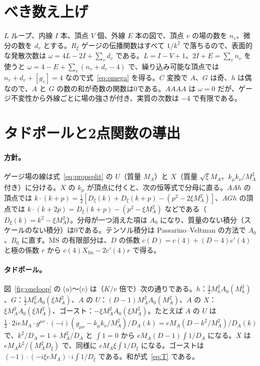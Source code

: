 \documentclass[a4paper,10pt]{ltjsarticle}
\newcommand{\MSbar}{\overline{\mathrm{MS}}}
\begin{document}
\section{べき数え上げ}\label{app:counting}

$L$ ループ、内線 $I$ 本、頂点 $V$ 個、外線 $E$ 本の図で、頂点 $v$ の場の数を $n_v$、微分の数を $d_v$ とする。$R_\xi$ ゲージの伝播関数はすべて $1/k^2$ で落ちるので、表面的な発散次数は $\omega=4L-2I+\sum_vd_v$ である。$L=I-V+1$、$2I+E=\sum_vn_v$ を使うと $\omega=4-E+\sum_v(n_v+d_v-4)$ で、繰り込み可能な頂点では $n_v+d_v+[g_v]=4$ なので式~\eqref{eq:omega} を得る。$C$ 変換で $A$、$G$ は奇、$h$ は偶なので、$A$ と $G$ の数の和が奇数の関数は0である。$AAAA$ は $\omega=0$ だが、ゲージ不変性から外線ごとに場の強さが付き、実質の次数は $-4$ で有限である。

\section{タドポールと2点関数の導出}\label{app:se}

\paragraph{方針。}ゲージ場の線は式~\eqref{eq:propsplit} の $U$（質量 $M_A$）と $X$（質量 $\sqrt\xi M_A$、$k_\mu k_\nu/M_A^2$ 付き）に分ける。$X$ の $k_\mu$ が頂点に付くと、次の恒等式で分母に直る。$AAh$ の頂点では $k\cdot(k+p)=\frac12[D_\xi(k)+D_\xi(k+p)-(p^2-2\xi M_A^2)]$、$AGh$ の頂点では $k\cdot(k+2p)=D_\xi(k+p)-(p^2-\xi M_A^2)$ などである（$D_\xi(k)=k^2-\xi M_A^2$）。分母が一つ消えた項は $A_0$ になり、質量のない積分（スケールのない積分）は0である。テンソル積分は Passarino--Veltman の方法で $A_0$、$B_0$ に直す。$\MSbar$ の有限部分は、$D$ の係数 $c(D)=c(4)+(D-4)c'(4)$ と極の係数 $r$ から $c(4)X_{\mathrm{fin}}-2c'(4)r$ で得る。

\paragraph{タドポール。}図~\ref{fig:oneloop} の (a)〜(c) は（$K/v$ 倍で）次の通りである。$h$：$\frac32M_h^2A_0(M_h^2)$、$G$：$\frac12M_h^2A_0(\xi M_A^2)$、$A$ の $U$：$(D-1)M_A^2A_0(M_A^2)$、$A$ の $X$：$\xi M_A^2A_0(\xi M_A^2)$、ゴースト：$-\xi M_A^2A_0(\xi M_A^2)$。たとえば $A$ の $U$ は $\frac12\cdot2ieM_A\cdot g^{\mu\nu}\cdot(-i)(g_{\mu\nu}-k_\mu k_\nu/M_A^2)/D_A(k)=eM_A(D-k^2/M_A^2)/D_A(k)$ で、$k^2/D_A=1+M_A^2/D_A$ と $\int1=0$ から $eM_A(D-1)\int1/D_A$ になる。$X$ は $eM_Ak^2/(M_A^2D_\xi)$ で、同様に $eM_A\xi\int1/D_\xi$ になる。ゴーストは $(-1)\cdot(-i\xi eM_A)\cdot i\int1/D_\xi$ である。和が式~\eqref{eq:T} である。
\end{document}

